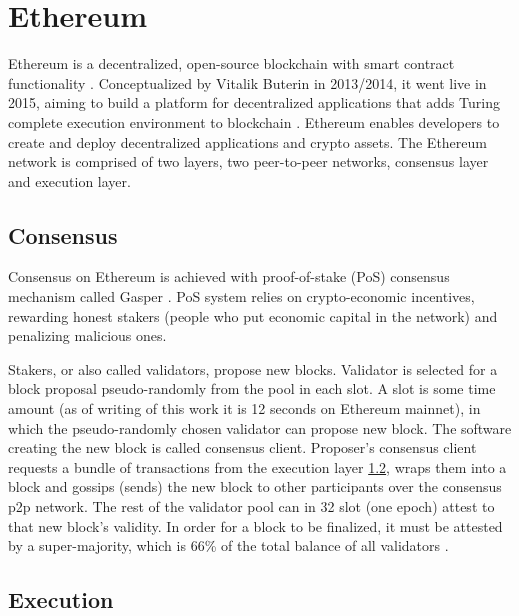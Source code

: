 \section{Ethereum}\label{sec:ethereum}

Ethereum is a decentralized, open-source blockchain with smart contract
functionality \cite{ethereumEthereumWhitepaper}. Conceptualized by Vitalik
Buterin in 2013/2014, it went live in 2015, aiming to build a platform for
decentralized applications that adds Turing complete execution environment
to blockchain \cite{ethereumWhitePaperPdf}. Ethereum enables developers to
create and deploy decentralized applications and crypto assets.
The Ethereum network is comprised of two layers, two peer-to-peer networks,
consensus layer and execution layer.

\subsection{Consensus}\label{subsec:ethereum_consensus}

Consensus on Ethereum is achieved with proof-of-stake (PoS) consensus mechanism
called Gasper \cite{VitalikGasper}. PoS system relies on crypto-economic incentives,
rewarding honest stakers (people who put economic capital in the network)
and penalizing malicious ones.

Stakers, or also called validators, propose new blocks. Validator is selected for
a block proposal pseudo-randomly from the pool in each slot. A slot is some
time amount (as of writing of this work it is 12 seconds on Ethereum mainnet),
in which the pseudo-randomly chosen validator can propose new block. The software
creating the new block is called consensus client. Proposer's consensus client
requests a bundle of transactions from the execution layer \ref{subsec:ethereum_execution},
wraps them into a block and gossips (sends) the new block to other participants
over the consensus p2p network. The rest of the validator pool can in 32 slot
(one epoch) attest to that new block's validity. In order for a block to be
finalized, it must be attested by a super-majority, which is 66\% of the total
balance of all validators \cite{ethereumConsensusMechanisms}.

\subsection{Execution}\label{subsec:ethereum_execution}

